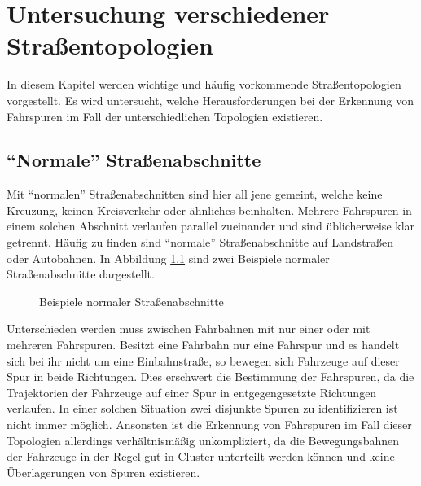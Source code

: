 
\chapter{Untersuchung verschiedener Straßentopologien}
\label{cha:street_topologies}


In diesem Kapitel werden wichtige und häufig vorkommende Straßentopologien vorgestellt.
Es wird untersucht, welche Herausforderungen bei der Erkennung von Fahrspuren im Fall der unterschiedlichen
Topologien existieren.

\section{``Normale'' Straßenabschnitte}

Mit ``normalen'' Straßenabschnitten sind hier all jene gemeint, welche keine Kreuzung, keinen Kreisverkehr
oder ähnliches beinhalten. Mehrere Fahrspuren in einem solchen Abschnitt verlaufen parallel zueinander
und sind üblicherweise klar getrennt.
Häufig zu finden sind ``normale'' Straßenabschnitte auf Landstraßen oder Autobahnen. In Abbildung
\ref{fig:topos_normal_lanes} sind zwei Beispiele normaler Straßenabschnitte dargestellt.

\begin{figure}[H]
    \centering
    \qquad \qquad
    \caption{Beispiele normaler Straßenabschnitte}
    \label{fig:topos_normal_lanes}
\end{figure}

Unterschieden werden muss zwischen Fahrbahnen mit nur einer oder mit mehreren Fahrspuren. Besitzt
eine Fahrbahn nur eine Fahrspur und es handelt sich bei ihr nicht um eine Einbahnstraße, so bewegen
sich Fahrzeuge auf dieser Spur in beide Richtungen. Dies erschwert die Bestimmung der Fahrspuren,
da die Trajektorien der Fahrzeuge auf einer Spur in entgegengesetzte Richtungen verlaufen.
In einer solchen Situation zwei disjunkte Spuren zu identifizieren ist nicht immer möglich.
Ansonsten ist die Erkennung von Fahrspuren im Fall dieser Topologien allerdings verhältnismäßig unkompliziert,
da die Bewegungsbahnen der Fahrzeuge in der Regel gut in Cluster unterteilt werden können und keine Überlagerungen
von Spuren existieren.

